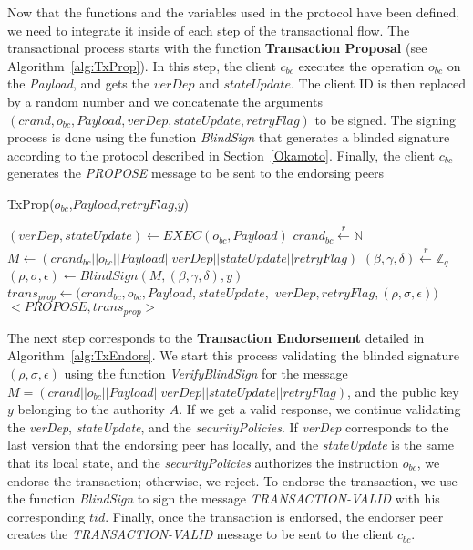 \documentclass[conference]{llncs}
\begin{document}
Now that the functions and the variables used in the protocol have been defined, we need to integrate it inside of each step of the transactional flow. The transactional process starts with the function \textbf{Transaction Proposal} (see Algorithm~\ref{alg:TxProp}). In this step, the client $c_{bc}$ executes the operation $o_{bc}$ on the \textit{Payload}, and gets the $verDep$ and $stateUpdate$. The client ID is then replaced by a random number and we concatenate the arguments $(crand,o_{bc},Payload, verDep,stateUpdate,retryFlag)$ to be signed. The signing process is done using the function \textit{BlindSign} that generates a blinded signature according to the protocol described in Section~\ref{Okamoto}. Finally, the client $c_{bc}$ generates the \textit{PROPOSE} message to be sent to the endorsing peers 

\begin{algorithm}[ht]
\caption{TxProp($o_{bc}$,$Payload$,$retryFlag$,$y$)}
\label{alg:TxProp}
\begin{algorithmic}[1]
\STATE $(verDep,stateUpdate) \gets EXEC(o_{{bc}},Payload)$ 
\STATE $crand_{bc}\xleftarrow[]{r}\mathbb{N}$ 
\STATE $M \gets (crand_{bc}||o_{bc}||Payload||verDep||stateUpdate||retryFlag)$
\STATE $(\beta,\gamma,\delta)\xleftarrow[]{r}\mathbb{Z}_q$  
\STATE $(\rho,\sigma,\epsilon) \gets BlindSign(M,(\beta,\gamma,\delta),y)$
\STATE $trans_{prop} \gets (crand_{bc},o_{bc},Payload,stateUpdate,$ $verDep, retryFlag,(\rho,\sigma,\epsilon))$
\RETURN $<\textit{PROPOSE},trans_{prop}>$
\end{algorithmic}
\end{algorithm}

The next step corresponds to the \textbf{Transaction Endorsement} detailed in Algorithm~\ref{alg:TxEndors}. We start this process validating the blinded signature $(\rho,\sigma,\epsilon)$ using the function \textit{VerifyBlindSign} for the message $M=(crand\vert\vert o_{bc} \vert\vert Payload \vert\vert verDep \vert\vert stateUpdate \vert\vert retryFlag)$, and the public key $y$ belonging to the authority $A$. If we get a valid response, we continue validating the \textit{verDep}, \textit{stateUpdate}, and the \textit{securityPolicies}. If \textit{verDep} corresponds to the last version that the endorsing peer has locally, and the \textit{stateUpdate} is the same that its local state, and the \textit{securityPolicies} authorizes the instruction $o_{bc}$, we endorse the transaction; otherwise, we reject. To endorse the transaction, we use the function \textit{BlindSign} to sign the message \textit{TRANSACTION-VALID} with his corresponding $tid$. Finally, once the transaction is endorsed, the endorser peer creates the \textit{TRANSACTION-VALID} message to be sent to the client $c_{bc}$.
\end{document}
